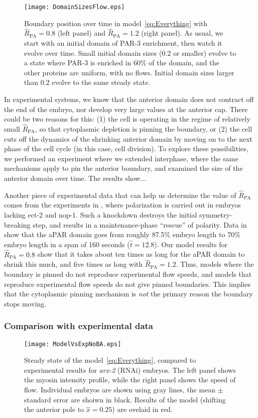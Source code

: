 \documentclass[11pt]{article}
\newcommand{\red}[1]{\color{red}#1\normalcolor}
\newcommand{\6}[1]{#1_{\text{6}}}
\newcommand{\3}[1]{#1_{\text{3}}}
\begin{document}
\begin{figure}
\centering
\texttt{[image: DomainSizesFlow.eps]}
\caption{\label{fig:BPosNBA}Boundary position over time in model\ \eqref{eq:Everything} with $\hat R_\text{PA}=0.8$ (left panel) and $\hat R_\text{PA}=1.2$ (right panel). As usual, we start with an initial domain of PAR-3 enrichment, then watch it evolve over time. Small initial domain sizes (0.2 or smaller) evolve to a state where PAR-3 is enriched in 60\% of the domain, and the other proteins are uniform, with no flows. Initial domain sizes larger than 0.2 evolve to the same steady state.}
\end{figure}

In experimental systems, we know that the anterior domain does not contract off the end of the embryo, nor develop very large values at the anterior cap. There could be two reasons for this: (1) the cell is operating in the regime of relatively small $\hat R_\text{PA}$, so that cytoplasmic depletion is pinning the boundary, or (2) the cell cuts off the dynamics of the shrinking anterior domain by moving on to the next phase of the cell cycle (in this case, cell division). \red{To explore these possibilities, we performed an experiment where we extended interphase, where the same mechanisms apply to pin the anterior boundary, and examined the size of the anterior domain over time. The results show...}

Another piece of experimental data that can help us determine the value of $\hat R_\text{PA}$ comes from the experiments in \cite{tse2012rhoa}, where polarization is carried out in embryos lacking ect-2 and nop-1. Such a knockdown destroys the initial symmetry-breaking step, and results in a maintenance-phase ``rescue'' of polarity. Data in \cite[Fig.~7D]{tse2012rhoa} show that the aPAR domain goes from roughly 87.5\% embryo length to 70\% embryo length in a span of 160 seconds ($\hat t = 12.8$). Our model results for $\hat R_\text{PA}=0.8$ show that it takes about ten times as long for the aPAR domain to shrink this much, and five times as long with $\hat R_\text{PA}=1.2$. Thus, models where the boundary is pinned do not reproduce experimental flow speeds, and models that reproduce experimental flow speeds do not give pinned boundaries. This implies that the cytoplasmic pinning mechanism is \emph{not} the primary reason the boundary stops moving.

\subsubsection{Comparison with experimental data}
\begin{figure}
\centering
\texttt{[image: ModelVsExpNoBA.eps]}
\caption{\label{fig:StStNoBA}Steady state of the model\ \eqref{eq:Everything}, compared to experimental results for \emph{arx-2} (RNAi) embryos. The left panel shows the myosin intensity profile, while the right panel shows the speed of flow. Individual embryos are shown using gray lines, the mean $\pm$ standard error are shoiwn in black. Results of the model (shifting the anterior pole to $\hat x = 0.25$) are ovelaid in red.}
\end{figure}
\end{document}
